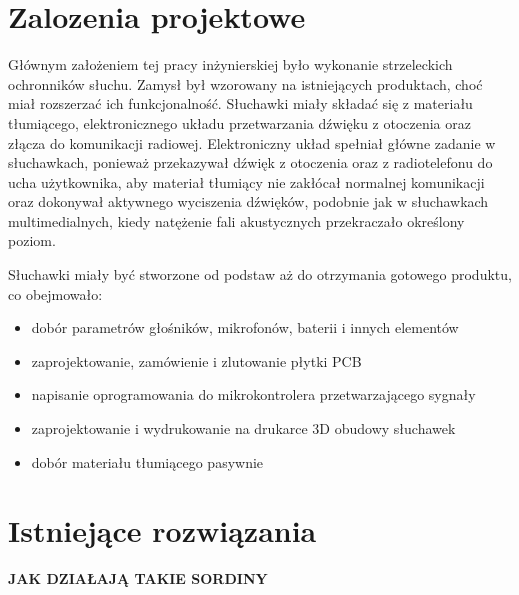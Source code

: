 \chapter{Zalozenia projektowe}
\label{cha: zalozeniaprojektowe}

Głównym założeniem tej pracy inżynierskiej było wykonanie strzeleckich ochronników słuchu. Zamysł był wzorowany na istniejących produktach, choć miał rozszerzać ich funkcjonalność. Słuchawki miały składać się z materiału tłumiącego, elektronicznego układu przetwarzania dźwięku z otoczenia oraz złącza do komunikacji radiowej. Elektroniczny układ spełniał główne zadanie w słuchawkach, ponieważ przekazywał dźwięk z otoczenia oraz z radiotelefonu do ucha użytkownika, aby materiał tłumiący nie zakłócał normalnej komunikacji oraz dokonywał aktywnego wyciszenia dźwięków, podobnie jak w słuchawkach multimedialnych, kiedy natężenie fali akustycznych przekraczało określony poziom.

Słuchawki miały być stworzone od podstaw aż do otrzymania gotowego produktu, co obejmowało:

\begin{itemize}
	\item dobór parametrów głośników, mikrofonów, baterii i innych elementów
	\item zaprojektowanie, zamówienie i zlutowanie płytki PCB
	\item napisanie oprogramowania do mikrokontrolera przetwarzającego sygnały
	\item zaprojektowanie i wydrukowanie na drukarce 3D obudowy słuchawek
	\item dobór materiału tłumiącego pasywnie
\end{itemize}

\chapter{Istniejące rozwiązania}

\textbf{JAK DZIAŁAJĄ TAKIE SORDINY}